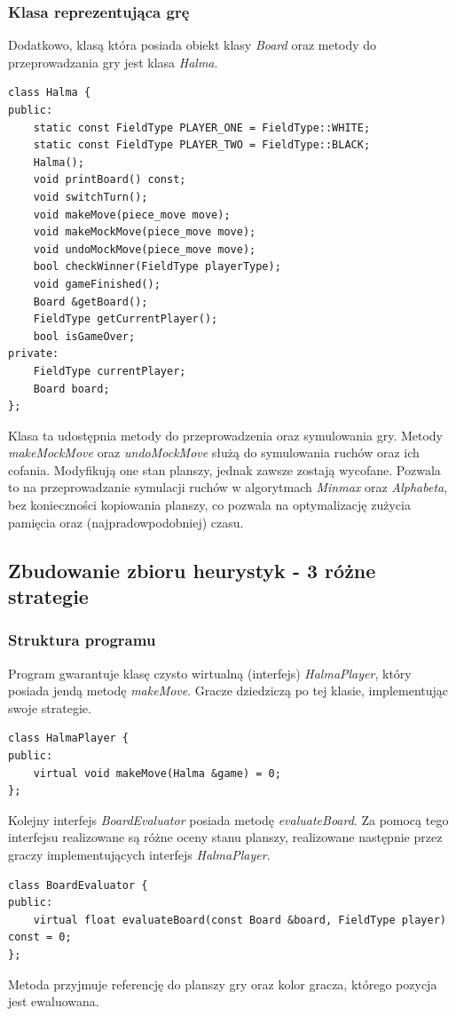 \documentclass[a4paper, 12pt]{article}
\begin{document}
\subsubsection{Klasa reprezentująca grę}
Dodatkowo, klasą która posiada obiekt klasy \textit{Board} oraz
metody do przeprowadzania gry jest klasa \textit{Halma}.
\begin{lstlisting}
class Halma {
public:
    static const FieldType PLAYER_ONE = FieldType::WHITE;
    static const FieldType PLAYER_TWO = FieldType::BLACK;
    Halma();
    void printBoard() const;
    void switchTurn();
    void makeMove(piece_move move);
    void makeMockMove(piece_move move);
    void undoMockMove(piece_move move);
    bool checkWinner(FieldType playerType);
    void gameFinished();
    Board &getBoard();
    FieldType getCurrentPlayer();
    bool isGameOver;
private:
    FieldType currentPlayer;
    Board board;
};
\end{lstlisting}
Klasa ta udostępnia metody do przeprowadzenia oraz symulowania gry. 
Metody \textit{makeMockMove} oraz \textit{undoMockMove} służą do
symulowania ruchów oraz ich cofania. Modyfikują one stan planszy,
jednak zawsze zostają wycofane. Pozwala to na przeprowadzanie 
symulacji ruchów w algorytmach \textit{Minmax} oraz \textit{Alphabeta}, 
bez konieczności kopiowania planszy, co pozwala na optymalizację 
zużycia pamięcia oraz (najpradowpodobniej) czasu.


\subsection{Zbudowanie zbioru heurystyk - 3 różne strategie}
\subsubsection{Struktura programu} 
Program gwarantuje klasę czysto wirtualną (interfejs) \textit{HalmaPlayer},
który posiada jendą metodę \textit{makeMove}. Gracze 
dziedziczą po tej klasie, implementując swoje strategie.
\begin{lstlisting}
class HalmaPlayer {
public:
    virtual void makeMove(Halma &game) = 0;
};
\end{lstlisting}


Kolejny interfejs \textit{BoardEvaluator} posiada metodę \textit{evaluateBoard}.
Za pomocą tego interfejsu realizowane są różne oceny stanu planszy, 
realizowane następnie przez graczy implementujących interfejs \textit{HalmaPlayer}.
\begin{lstlisting}
class BoardEvaluator {
public:
    virtual float evaluateBoard(const Board &board, FieldType player) const = 0;
};
\end{lstlisting}
Metoda przyjmuje referencję do planszy gry oraz kolor gracza, którego pozycja 
jest ewaluowana.
\end{document}
